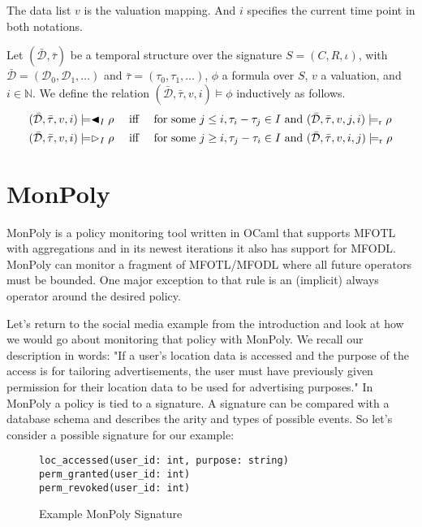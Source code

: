 The data list $v$ is the valuation mapping.
And $i$ specifies the current time point in both notations.
\begin{definition}
    \label{def:mfodl-eval}
    Let $(\bar{\mathcal{D}}, \bar{\tau})$ be a temporal structure over the signature $S = (C,R,\iota)$, with $\bar{\mathcal{D}} = (\mathcal{D}_0,\mathcal{D}_1,\dots)$ and $\bar{\tau} = (\tau_0, \tau_1, \dots)$, $\phi$ a formula over $S$, $v$ a valuation, and $i \in \mathbb{N}$.
    We define the relation $(\bar{\mathcal{D}},\bar{\tau},v,i) \models \phi$ inductively as follows.
    \begin{alignat*}{3}
        &(\bar{\mathcal{D}},\bar{\tau},v,i) \models \blacktriangleleft_{I} \rho
            &&\text{ iff } && \text{for some } j \leq i, \tau_i - \tau_j \in I \text{ and }(\bar{\mathcal{D}}, \bar{\tau}, v, j, i) \models_{\text{r}} \rho \\
        &(\bar{\mathcal{D}},\bar{\tau},v,i) \models \vartriangleright_{I} \rho
            &&\text{ iff } && \text{for some } j \geq i, \tau_j - \tau_i \in I \text{ and }(\bar{\mathcal{D}}, \bar{\tau}, v, i, j) \models_{\text{r}} \rho \\
    \end{alignat*}
    
\end{definition}


\section{MonPoly}
MonPoly \cite{Basin2017} is a policy monitoring tool written in OCaml that supports MFOTL with aggregations and in its newest iterations it also has support for MFODL.
MonPoly can monitor a fragment of MFOTL/MFODL where all future operators must be bounded.
One major exception to that rule is an (implicit) always operator around the desired policy.

Let's return to the social media example from the introduction and look at how we would go about monitoring that policy with MonPoly.
We recall our description in words:
    "If a user's location data is accessed and the purpose of the access is for tailoring advertisements, the user must have previously given permission for their location data to be used for advertising purposes."
In MonPoly a policy is tied to a signature.
A signature can be compared with a database schema and describes the arity and types of possible events.
So let's consider a possible signature for our example: 

\begin{figure}[H]
    \label{fig:example-signature}
\begin{verbatim}
loc_accessed(user_id: int, purpose: string)
perm_granted(user_id: int)
perm_revoked(user_id: int)
\end{verbatim}
    \caption{Example MonPoly Signature}
\end{figure}

